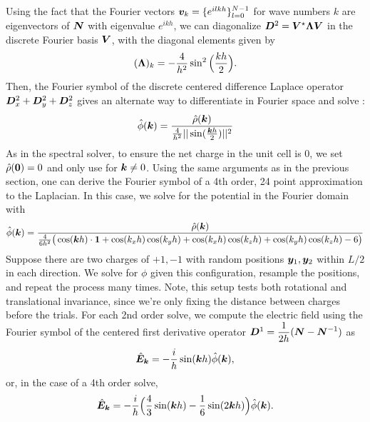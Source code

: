 Using the fact that the Fourier vectors $\boldsymbol v_k = \{e^{ilkh}\}_{l=0}^{N-1}$ for wave numbers $k$ are eigenvectors of $\boldsymbol N$ with eigenvalue $e^{ikh}$, we can diagonalize $\boldsymbol D^2 = \boldsymbol V^\star \boldsymbol \Lambda \boldsymbol V$ in the discrete Fourier basis $\boldsymbol V$, with the diagonal elements given by
\begin{equation}
(\boldsymbol \Lambda)_k = \displaystyle -\frac{4}{h^2}\sin^2\Big(\frac{kh}{2}\Big).
\end{equation}
Then, the Fourier symbol of the discrete centered difference Laplace operator $\boldsymbol D_x^2 + \boldsymbol D_y^2 + \boldsymbol D_z^2$ gives an alternate way to differentiate in Fourier space and solve :
\begin{equation}\label{diffsolve}
\hat{\phi}(\bs k) = \displaystyle \frac{\hat{\rho}(\bs k)}{\frac{4}{h^2}||\sin(\frac{\bs k h}{2})||^2}%
\end{equation}
As in the spectral solver, to ensure the net charge in the unit cell is 0, we set $\hat{\rho}(\boldsymbol 0)=0$ and only use  for $\boldsymbol k \neq 0$.
Using the same arguments as in the previous section, one can derive the Fourier symbol of a 4th order, 24 point approximation to the Laplacian. In this case, we solve for the potential in the Fourier domain with
\begin{equation}
\hat{\phi}(\boldsymbol k) = \displaystyle \frac{\hat{\rho}(\boldsymbol k)}{\frac{4}{6h^2}\big(\cos(\boldsymbol k h) \cdot \boldsymbol{1} + \cos(k_x h)\cos(k_y h) + \cos(k_x h) \cos(k_z h) + \cos(k_y h)\cos(k_z h) - 6 \big)}
\end{equation}
Suppose there are two charges of $+1,-1$ with random positions $\boldsymbol y_1,\boldsymbol y_2$ within $L/2$ in each direction. We solve for $\phi$ given this configuration, resample the positions, and repeat the process many times. Note, this setup tests both rotational and translational invariance, since we're only fixing the distance between charges before the trials. For each 2nd order solve, we compute the electric field using the Fourier symbol of the centered first derivative operator $\boldsymbol D^1 = \displaystyle \frac{1}{2h}(\boldsymbol N - \boldsymbol N^{-1})$ as
\begin{equation}
\hat{\boldsymbol E}_{\boldsymbol k} = -\frac{i}{h}\sin(\boldsymbol k h)\hat{\phi}(\boldsymbol k),
\end{equation}  
or, in the case of a 4th order solve,
\begin{equation}
\hat{\boldsymbol E}_{\boldsymbol k} = \displaystyle -\frac{i}{h}\Big(\frac{4}{3}\sin(\boldsymbol kh) - \frac{1}{6}\sin(2\boldsymbol kh)\Big)\hat{\phi}(\boldsymbol k).
\end{equation}
